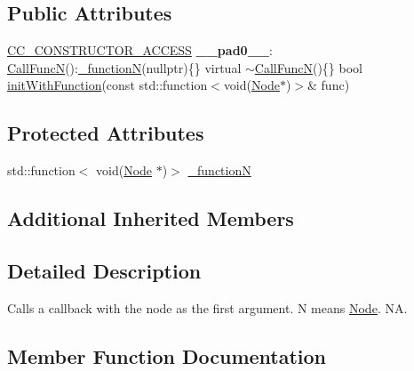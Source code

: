 \subsection*{Public Attributes}
\begin{DoxyCompactItemize}
\item 
\mbox{\label{classCallFuncN_aaecbd444ade8ea276984beec2b48b363}} 
\hyperlink{_2cocos2d_2cocos_2base_2ccConfig_8h_a25ef1314f97c35a2ed3d029b0ead6da0}{C\+C\+\_\+\+C\+O\+N\+S\+T\+R\+U\+C\+T\+O\+R\+\_\+\+A\+C\+C\+E\+SS} {\bfseries \+\_\+\+\_\+pad0\+\_\+\+\_\+}\+: \hyperlink{classCallFuncN}{Call\+FuncN}()\+:\hyperlink{classCallFuncN_aff197e1b3cf3827a5509366329fa902f}{\+\_\+functionN}(nullptr)\{\} virtual $\sim$\hyperlink{classCallFuncN}{Call\+FuncN}()\{\} bool \hyperlink{classCallFunc_ab6ad237cb23e996abc60f35ad5091233}{init\+With\+Function}(const std\+::function$<$void(\hyperlink{classNode}{Node}$\ast$)$>$\& func)
\end{DoxyCompactItemize}
\subsection*{Protected Attributes}
\begin{DoxyCompactItemize}
\item 
std\+::function$<$ void(\hyperlink{classNode}{Node} $\ast$)$>$ \hyperlink{classCallFuncN_aff197e1b3cf3827a5509366329fa902f}{\+\_\+functionN}
\end{DoxyCompactItemize}
\subsection*{Additional Inherited Members}


\subsection{Detailed Description}
Calls a \textquotesingle{}callback\textquotesingle{} with the node as the first argument. N means \hyperlink{classNode}{Node}.  NA. 

\subsection{Member Function Documentation}
\mbox{\label{classCallFuncN_a0284c35f23aa8b68bc921eb044b6dd54}} 
